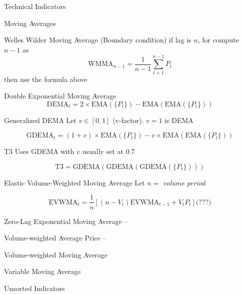 \documentclass{article}
\begin{document}
\begin{section}{Technical Indicators}
\begin{subsection}{Moving Averages}
\begin{subsubsection}{Welles Wilder Moving Average}
    (Boundary condition) if lag is $n$, for compute $n-1$ as
    \[ \text{WMMA}_{n-1} = \frac{1}{n-1} \sum_{t=1}^{n-1} P_t \]
    then use the formula above
  \end{subsubsection}

  \begin{subsubsection}{Double Exponential Moving Average}
    \[ \text{DEMA}_t = 2 \times \text{EMA}(\{P_t\}) - 
       \text{EMA}(\text{EMA}(\{P_t\})) \]
  \end{subsubsection}


  \begin{subsubsection}{Generalized DEMA}
    Let $v \in [0, 1]$ (v-factor). $v = 1$ is DEMA

    \[ \text{GDEMA}_t = (1 + v) \times \text{EMA}(\{P_t\}) - 
            v \times \text{EMA}(\text{EMA}(\{P_t\})) \]
  \end{subsubsection}

  \begin{subsubsection}{T3}
    Uses GDEMA with $v$ usually set at 0.7

    \[ \text{T3} = \text{GDEMA}(\text{GDEMA}(\text{GDEMA}(\{P_t\}))) \]
  \end{subsubsection}

  \begin{subsubsection}{Elastic Volume-Weighted Moving Average}
    Let $n =$ \textit{volume period}

    \[ \text{EVWMA}_t = \frac{1}{n} [(n - V_t) \text{EVWMA}_{t-1} + V_t P_t] 
         \text{(???)}\]
  \end{subsubsection}

  \begin{subsubsection}{Zero-Lag Exponential Moving Average}
    --
  \end{subsubsection}

  \begin{subsubsection}{Volume-weighted Average Price}
    --
  \end{subsubsection}

  \begin{subsubsection}{Volume-weighted Moving Average}
  \end{subsubsection}

  \begin{subsubsection}{Variable Moving Average}
  \end{subsubsection}


\end{subsection}

\begin{subsection}{Unsorted Indicators}



\end{subsection}
\end{section}
\end{document}
